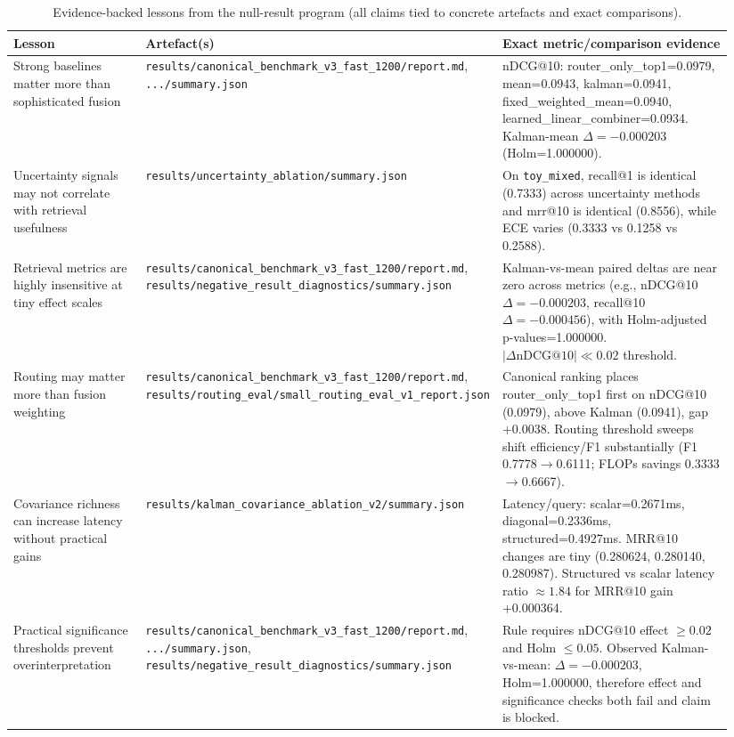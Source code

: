 \begin{table}[t]
\centering
\caption{Evidence-backed lessons from the null-result program (all claims tied to concrete artefacts and exact comparisons).}
\label{tab:lessons-from-failure}
\small
\begin{tabular}{p{0.23\linewidth}p{0.32\linewidth}p{0.39\linewidth}}
\toprule
Lesson & Artefact(s) & Exact metric/comparison evidence \\
\midrule
Strong baselines matter more than sophisticated fusion & \texttt{results/canonical\_benchmark\_v3\_fast\_1200/report.md}, \texttt{.../summary.json} & nDCG@10: router\_only\_top1=0.0979, mean=0.0943, kalman=0.0941, fixed\_weighted\_mean=0.0940, learned\_linear\_combiner=0.0934. Kalman-mean $\Delta=-0.000203$ (Holm=1.000000). \\
\midrule
Uncertainty signals may not correlate with retrieval usefulness & \texttt{results/uncertainty\_ablation/summary.json} & On \texttt{toy\_mixed}, recall@1 is identical (0.7333) across uncertainty methods and mrr@10 is identical (0.8556), while ECE varies (0.3333 vs 0.1258 vs 0.2588). \\
\midrule
Retrieval metrics are highly insensitive at tiny effect scales & \texttt{results/canonical\_benchmark\_v3\_fast\_1200/report.md}, \texttt{results/negative\_result\_diagnostics/summary.json} & Kalman-vs-mean paired deltas are near zero across metrics (e.g., nDCG@10 $\Delta=-0.000203$, recall@10 $\Delta=-0.000456$), with Holm-adjusted p-values=1.000000. $|\Delta\text{nDCG@10}| \ll 0.02$ threshold. \\
\midrule
Routing may matter more than fusion weighting & \texttt{results/canonical\_benchmark\_v3\_fast\_1200/report.md}, \texttt{results/routing\_eval/small\_routing\_eval\_v1\_report.json} & Canonical ranking places router\_only\_top1 first on nDCG@10 (0.0979), above Kalman (0.0941), gap +0.0038. Routing threshold sweeps shift efficiency/F1 substantially (F1 0.7778$\rightarrow$0.6111; FLOPs savings 0.3333$\rightarrow$0.6667). \\
\midrule
Covariance richness can increase latency without practical gains & \texttt{results/kalman\_covariance\_ablation\_v2/summary.json} & Latency/query: scalar=0.2671ms, diagonal=0.2336ms, structured=0.4927ms. MRR@10 changes are tiny (0.280624, 0.280140, 0.280987). Structured vs scalar latency ratio $\approx1.84$ for MRR@10 gain +0.000364. \\
\midrule
Practical significance thresholds prevent overinterpretation & \texttt{results/canonical\_benchmark\_v3\_fast\_1200/report.md}, \texttt{.../summary.json}, \texttt{results/negative\_result\_diagnostics/summary.json} & Rule requires nDCG@10 effect $\ge 0.02$ and Holm $\le 0.05$. Observed Kalman-vs-mean: $\Delta=-0.000203$, Holm=1.000000, therefore effect and significance checks both fail and claim is blocked. \\

\end{tabular}
\end{table}
